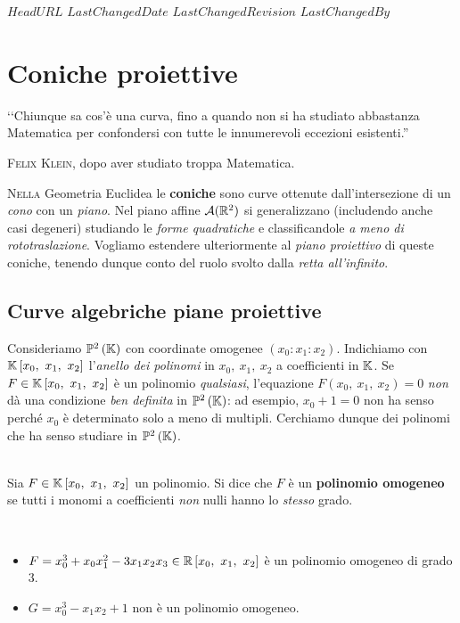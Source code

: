 \svnidlong
{$HeadURL$}
{$LastChangedDate$}
{$LastChangedRevision$}
{$LastChangedBy$}

\chapter{Coniche proiettive}

\begin{introduction}
	‘‘Chiunque sa cos'è una curva, fino a quando non si ha studiato abbastanza Matematica per confondersi con tutte le innumerevoli eccezioni esistenti.''
	\begin{flushright}
		\textsc{Felix Klein,} dopo aver studiato troppa Matematica.
	\end{flushright}
\end{introduction}
\lettrine[findent=1pt, nindent=0pt]{N}{ella} Geometria Euclidea le \textbf{coniche} sono curve ottenute dall'intersezione di un \textit{cono} con un \textit{piano}. Nel piano affine $\mathcal{A}(\mathbb{R}^2)$ si generalizzano (includendo anche casi degeneri) studiando le \textit{forme quadratiche} e classificandole \textit{a meno di rototraslazione}. Vogliamo estendere ulteriormente al \textit{piano proiettivo} di queste coniche, tenendo dunque conto del ruolo svolto dalla \textit{retta all'infinito}.
\section{Curve algebriche piane proiettive}
Consideriamo $\proj[2]{\kamp}$ con coordinate omogenee $(x_0\colon x_1\colon x_2)$. Indichiamo con $\kamp\left[x_0,\ x_1,\ x_2\right]$ l'\textit{anello dei polinomi} in $x_0,\ x_1,\ x_2$ a coefficienti in $\mathbb{K}$. Se $F\in\kamp\left[x_0,\ x_1,\ x_2\right]$ è un polinomio \textit{qualsiasi}, l'equazione $F(x_0,\ x_1,\ x_2)=0$ \textit{non} dà una condizione \textit{ben definita} in $\proj[2]{\kamp}$: ad esempio, $x_0+1=0$ non ha senso perché $x_0$ è determinato solo a meno di multipli. Cerchiamo dunque dei polinomi che ha senso studiare in $\proj[2]{\kamp}$.
\begin{define}~{}\\
Sia $F\in\kamp\left[x_0,\ x_1,\ x_2\right]$ un polinomio. Si dice che $F$ è un \textbf{polinomio omogeneo} se tutti i monomi a coefficienti \textit{non} nulli hanno lo \textit{stesso} grado.
\end{define}
\begin{examples}~{}
	\begin{itemize}
		\item $F=x_0^3+x_0x_1^2-3x_1x_2x_3\in\realset\left[x_0,\ x_1,\ x_2\right]$ è un polinomio omogeneo di grado $3$.
		\item $G=x_0^3-x_1x_2+1$ non è un polinomio omogeneo.
	\end{itemize}
\vspace{-3mm}
\end{examples}

